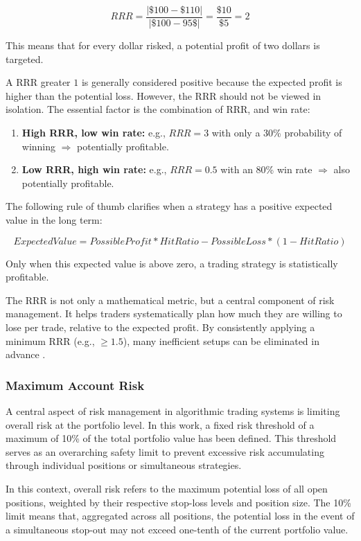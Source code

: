 \[
    RRR = \frac{|\$100 - \$110|}{|\$100 - 95\$|} = \frac{\$10}{\$5} = 2
\]

\noindent
This means that for every dollar risked, a potential profit of two dollars is targeted.

A RRR greater $1$ is generally considered positive because the expected profit is higher than the potential loss.
However, the RRR should not be viewed in isolation.
The essential factor is the combination of RRR, and win rate:

\begin{enumerate}
    \item \textbf{High RRR, low win rate:} e.g., $RRR=3$ with only a 30\% probability of winning $\Rightarrow$ potentially profitable.
    \item \textbf{Low RRR, high win rate:} e.g., $RRR=0.5$ with an 80\% win rate $\Rightarrow$ also potentially profitable.
\end{enumerate}

\noindent
The following rule of thumb clarifies when a strategy has a positive expected value in the long term:

\[
    ExpectedValue = PossibleProfit * HitRatio - PossibleLoss * (1 - HitRatio)
\]

\noindent
Only when this expected value is above zero, a trading strategy is statistically profitable.

The RRR is not only a mathematical metric, but a central component of risk management.
It helps traders systematically plan how much they are willing to lose per trade, relative to the expected profit.
By consistently applying a minimum RRR (e.g., $\ge 1.5$), many inefficient setups can be eliminated in advance \cite{bitpanda-crv}.

\subsubsection{Maximum Account Risk}

A central aspect of risk management in algorithmic trading systems is limiting overall risk at the portfolio level.
In this work, a fixed risk threshold of a maximum of 10\% of the total portfolio value has been defined.
This threshold serves as an overarching safety limit to prevent excessive risk accumulating through individual positions or simultaneous strategies.

In this context, overall risk refers to the maximum potential loss of all open positions, weighted by their respective stop-loss levels and position size.
The 10\% limit means that, aggregated across all positions, the potential loss in the event of a simultaneous stop-out may not exceed one-tenth of the current portfolio value.

